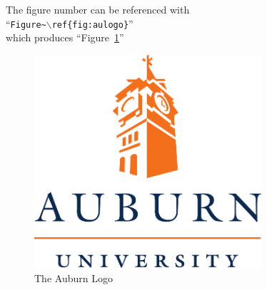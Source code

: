 \documentclass[12pt]{article}
\begin{document}
\LARGE
\noindent The figure number can be referenced with\\ ``\texttt{Figure\~{}$\backslash$ref\{fig:aulogo\}}''\\ which produces ``Figure~\ref{fig:aulogo}''
\begin{figure}[htbp]
  \centering
  \includegraphics[width=0.75\textwidth]{aulogo.pdf}
  \caption{\large The Auburn Logo}
  \label{fig:aulogo}
\end{figure}
\end{document}
